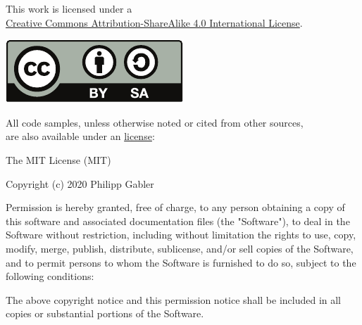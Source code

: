 \documentclass[11pt,a4paper,twoside,draft]{memoir}
\begin{document}
\pagestyle{simple}
\frontmatter


\movetooddpage


\movetooddpage


\begin{adjustwidth}{\absleftindent}{\absrightindent}
  \label{license}

  \abstracttextfont
  \begin{center}
    This work is licensed under a \\ \href{http://creativecommons.org/licenses/by-sa/4.0/}{Creative
      Commons Attribution-ShareAlike 4.0 International License}.
  \end{center}
  \begin{center}
    \includegraphics[scale=1]{figures/by-sa}
  \end{center}
  \begin{center}
    All code samples, unless otherwise noted or cited from other sources, \\ are also available under an
    \href{http://opensource.org/licenses/MIT}{ license}:
  \end{center}
  \vspace*{-1ex}
  \begin{ttfamily}
    \setlength{\parskip}{12pt}
    \setlength{\parindent}{0pt}
    The MIT License (MIT)

    Copyright (c) 2020 Philipp Gabler

    Permission is hereby granted, free of charge, to any person obtaining a copy of this software
    and associated documentation files (the "Software"), to deal in the Software without
    restriction, including without limitation the rights to use, copy, modify, merge, publish,
    distribute, sublicense, and/or sell copies of the Software, and to permit persons to whom the
    Software is furnished to do so, subject to the following conditions:

    The above copyright notice and this permission notice shall be included in all copies or
    substantial portions of the Software.


\end{ttfamily}
\end{adjustwidth}
\end{document}
